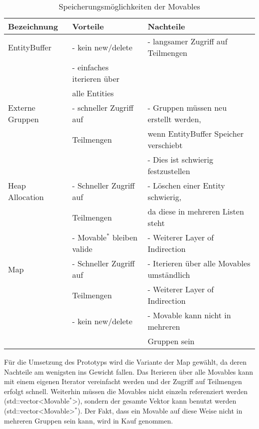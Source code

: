 \documentclass[11pt,a4paper]{article}
\begin{document}
\begin{center}
\begin{table}[!ht]
\begin{tabular}{l | l | l}
\textbf{Bezeichnung} & \textbf{Vorteile} & \textbf{Nachteile}\\
\hline
EntityBuffer & - kein new/delete & - langsamer Zugriff auf Teilmengen \\
& - einfaches iterieren über\\
& \hspace{4pt} alle Entities\\
 \hline
Externe Gruppen & - schneller Zugriff auf & - Gruppen müssen neu erstellt werden, \\
& \hspace{4pt} Teilmengen &\hspace{4pt}  wenn EntityBuffer Speicher verschiebt\\
& & - Dies ist schwierig festzustellen\\
\hline
Heap Allocation & - Schneller Zugriff auf & - Löschen einer Entity schwierig,\\
& \hspace{4pt} Teilmengen & \hspace{4pt} da diese in mehreren Listen steht\\
& - Movable$^\ast$ bleiben valide & - Weiterer Layer of Indirection\\
\hline
Map & - Schneller Zugriff auf & - Iterieren über alle Movables umständlich\\
& \hspace{4pt} Teilmengen & - Weiterer Layer of Indirection\\
& - kein new/delete& - Movable kann nicht in mehreren \\
& & \hspace{4pt} Gruppen sein \\
\end{tabular}
\captionsetup{justification=centering}
\caption[Speicherungsmöglichkeiten der Movables]{Speicherungsmöglichkeiten der Movables}
\label{tab:MemoryManagement}
\end{table}
\end{center}
\normalsize
Für die Umsetzung des Prototyps wird die Variante der Map gewählt, da deren Nachteile am wenigsten ins Gewicht fallen. Das Iterieren über alle Movables kann mit einem eigenen Iterator vereinfacht werden und der Zugriff auf Teilmengen erfolgt schnell. Weiterhin müssen die Movables nicht einzeln referenziert werden (std::vector\textless Movable$^\ast$\textgreater), sondern der gesamte Vektor kann benutzt werden (std::vector\textless Movable\textgreater$^\ast$). Der Fakt, dass ein Movable auf diese Weise nicht in mehreren Gruppen sein kann, wird in Kauf genommen.
\end{document}
